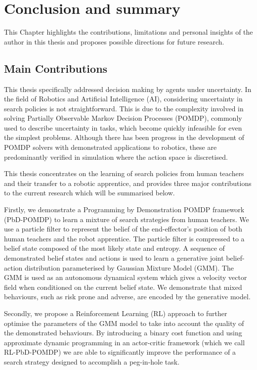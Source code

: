 \chapter{Conclusion and summary}

This Chapter highlights the contributions, limitations and personal insights of the author in this thesis and 
proposes possible directions for future research.

\section{Main Contributions}

This thesis specifically addressed decision making by agents under uncertainty. 
In the field of Robotics and Artificial Intelligence (AI), considering uncertainty in search policies is not straightforward. 
This is due to the complexity involved in solving Partially Observable Markov Decision Processes (POMDP), 
commonly used to describe uncertainty in tasks, which become quickly infeasible for even the simplest problems. Although there has been progress in the 
development of POMDP solvers with demonstrated applications to robotics, these are predominantly verified in simulation where the action space is discretised.  

This thesis concentrates on the learning of search policies from human teachers and their transfer to a robotic apprentice,
and provides three major contributions to the current research which will be summarised below.

Firstly, we demonstrate a Programming by Demonstration POMDP framework (PbD-POMDP) to learn a mixture of search strategies 
from human teachers. We use a particle filter to represent the belief of the end-effector's position of both human teachers and the robot apprentice.
The particle filter is compressed to a belief state composed of the most likely state and entropy. 
A sequence of demonstrated belief states and actions is used to learn a generative joint belief-action distribution parameterised by 
Gaussian Mixture Model (GMM). The GMM is used as an autonomous dynamical system which gives a velocity vector field when conditioned on the current
belief state. We demonstrate that mixed behaviours, such as risk prone and adverse, are encoded by the generative model. 

Secondly, we propose a Reinforcement Learning (RL) approach to further optimise the parameters of the GMM model
to take into account the quality of the demonstrated behaviours. By introducing a binary cost function and using 
approximate dynamic programming in an actor-critic framework (which we call RL-PbD-POMDP) we are able to 
significantly improve the performance of a search strategy designed to accomplish a peg-in-hole task.

